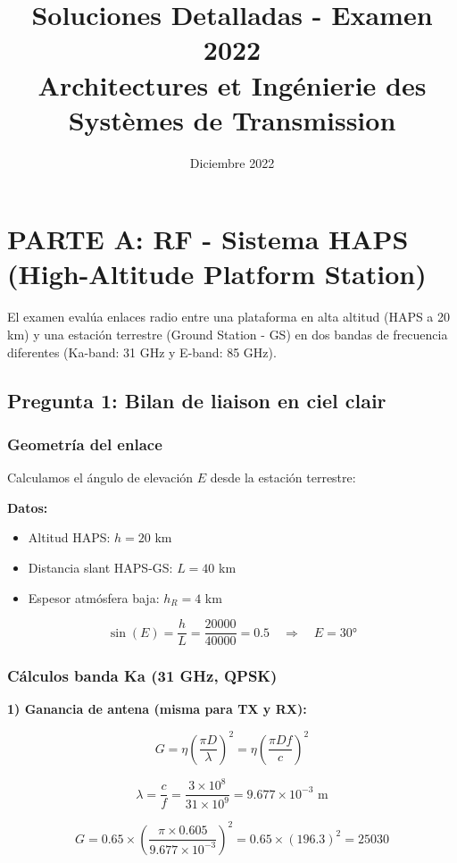 \documentclass[12pt,a4paper]{extarticle}
\title{\textbf{Soluciones Detalladas - Examen 2022\\Architectures et Ingénierie des Systèmes de Transmission}}
\author{}
\date{Diciembre 2022}
\begin{document}
\maketitle

\section*{PARTE A: RF - Sistema HAPS (High-Altitude Platform Station)}

El examen evalúa enlaces radio entre una plataforma en alta altitud (HAPS a 20 km) y una estación terrestre (Ground Station - GS) en dos bandas de frecuencia diferentes (Ka-band: 31 GHz y E-band: 85 GHz).

\subsection*{Pregunta 1: Bilan de liaison en ciel clair}

\subsubsection*{Geometría del enlace}

Calculamos el ángulo de elevación $E$ desde la estación terrestre:

\textbf{Datos:}
\begin{itemize}
    \item Altitud HAPS: $h = 20$ km
    \item Distancia slant HAPS-GS: $L = 40$ km
    \item Espesor atmósfera baja: $h_R = 4$ km
\end{itemize}

$$\sin(E) = \frac{h}{L} = \frac{20000}{40000} = 0.5 \quad \Rightarrow \quad E = 30°$$

\subsubsection*{Cálculos banda Ka (31 GHz, QPSK)}

\textbf{1) Ganancia de antena (misma para TX y RX):}

$$G = \eta \left(\frac{\pi D}{\lambda}\right)^2 = \eta \left(\frac{\pi D f}{c}\right)^2$$

$$\lambda = \frac{c}{f} = \frac{3 \times 10^8}{31 \times 10^9} = 9.677 \times 10^{-3} \text{ m}$$

$$G = 0.65 \times \left(\frac{\pi \times 0.605}{9.677 \times 10^{-3}}\right)^2 = 0.65 \times (196.3)^2 = 25030$$
\end{document}
